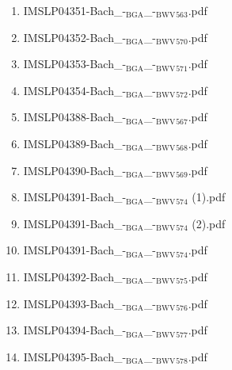 \documentclass[11pt]{article}
\begin{document}
\begin{enumerate}
\begin{enumerate}
\begin{enumerate}
\begin{enumerate}
\item IMSLP04351-Bach\_-$_{\text{BGA}}$\_-$_{\text{BWV}}$$_{\text{563}}$.pdf
\label{sec-1-1-1-1-44-6-4-1-4-33}

\item IMSLP04352-Bach\_-$_{\text{BGA}}$\_-$_{\text{BWV}}$$_{\text{570}}$.pdf
\label{sec-1-1-1-1-44-6-4-1-4-34}

\item IMSLP04353-Bach\_-$_{\text{BGA}}$\_-$_{\text{BWV}}$$_{\text{571}}$.pdf
\label{sec-1-1-1-1-44-6-4-1-4-35}

\item IMSLP04354-Bach\_-$_{\text{BGA}}$\_-$_{\text{BWV}}$$_{\text{572}}$.pdf
\label{sec-1-1-1-1-44-6-4-1-4-36}

\item IMSLP04388-Bach\_-$_{\text{BGA}}$\_-$_{\text{BWV}}$$_{\text{567}}$.pdf
\label{sec-1-1-1-1-44-6-4-1-4-37}

\item IMSLP04389-Bach\_-$_{\text{BGA}}$\_-$_{\text{BWV}}$$_{\text{568}}$.pdf
\label{sec-1-1-1-1-44-6-4-1-4-38}

\item IMSLP04390-Bach\_-$_{\text{BGA}}$\_-$_{\text{BWV}}$$_{\text{569}}$.pdf
\label{sec-1-1-1-1-44-6-4-1-4-39}

\item IMSLP04391-Bach\_-$_{\text{BGA}}$\_-$_{\text{BWV}}$$_{\text{574}}$ (1).pdf
\label{sec-1-1-1-1-44-6-4-1-4-40}

\item IMSLP04391-Bach\_-$_{\text{BGA}}$\_-$_{\text{BWV}}$$_{\text{574}}$ (2).pdf
\label{sec-1-1-1-1-44-6-4-1-4-41}

\item IMSLP04391-Bach\_-$_{\text{BGA}}$\_-$_{\text{BWV}}$$_{\text{574}}$.pdf
\label{sec-1-1-1-1-44-6-4-1-4-42}

\item IMSLP04392-Bach\_-$_{\text{BGA}}$\_-$_{\text{BWV}}$$_{\text{575}}$.pdf
\label{sec-1-1-1-1-44-6-4-1-4-43}

\item IMSLP04393-Bach\_-$_{\text{BGA}}$\_-$_{\text{BWV}}$$_{\text{576}}$.pdf
\label{sec-1-1-1-1-44-6-4-1-4-44}

\item IMSLP04394-Bach\_-$_{\text{BGA}}$\_-$_{\text{BWV}}$$_{\text{577}}$.pdf
\label{sec-1-1-1-1-44-6-4-1-4-45}

\item IMSLP04395-Bach\_-$_{\text{BGA}}$\_-$_{\text{BWV}}$$_{\text{578}}$.pdf
\label{sec-1-1-1-1-44-6-4-1-4-46}


\end{enumerate}
\end{enumerate}
\end{enumerate}
\end{enumerate}
\end{document}
